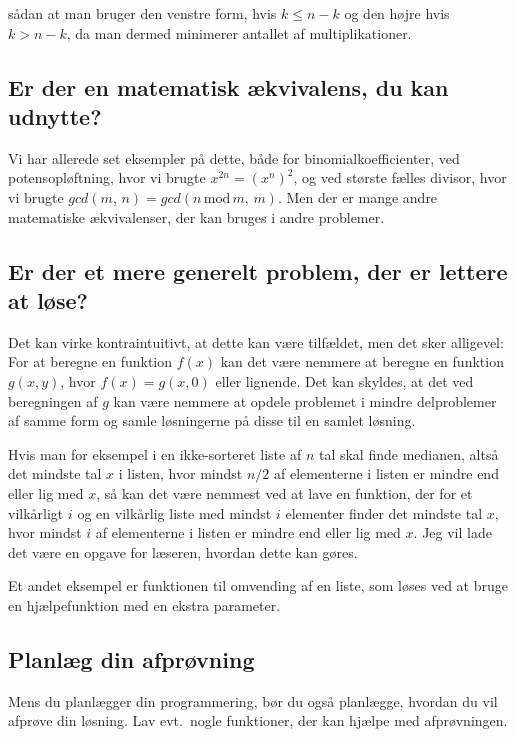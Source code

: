 \documentclass[a4paper,12pt]{article}
\begin{document}
\noindent
sådan at man bruger den venstre form, hvis $k\leq n-k$ og den højre
hvis $k> n-k$, da man dermed minimerer antallet af multiplikationer.

\subsection*{Er der en matematisk ækvivalens, du kan udnytte?}

Vi har allerede set eksempler på dette, både for
binomialkoefficienter, ved potensopløftning, hvor vi brugte $x^{2n} =
(x^n)^2$, og ved største fælles divisor, hvor vi brugte $gcd(m,\,n) =
gcd(n\,\textrm{mod}\,m,\, m)$.  Men der er mange andre matematiske
ækvivalenser, der kan bruges i andre problemer.

\subsection*{Er der et mere generelt problem, der er lettere at løse?}

Det kan virke kontraintuitivt, at dette kan være tilfældet, men det sker
alligevel: For at beregne en funktion $f(x)$ kan det være nemmere at
beregne en funktion $g(x,y)$, hvor $f(x) = g(x,0)$ eller lignende.
Det kan skyldes, at det ved beregningen af $g$ kan være nemmere at
opdele problemet i mindre delproblemer af samme form og samle
løsningerne på disse til en samlet løsning.

Hvis man for eksempel i en ikke-sorteret liste af $n$ tal skal finde
medianen, altså det mindste tal $x$ i listen, hvor mindst $n/2$ af
elementerne i listen er mindre end eller lig med $x$, så kan det være
nemmest ved at lave en funktion, der for et vilkårligt $i$ og en
vilkårlig liste med mindst $i$ elementer finder det mindste tal $x$,
hvor mindst $i$ af elementerne i listen er mindre end eller lig med
$x$.  Jeg vil lade det være en opgave for læseren, hvordan dette kan
gøres.

Et andet eksempel er funktionen til omvending af en liste, som løses
ved at bruge en hjælpefunktion med en ekstra parameter.

\subsection*{Planlæg din afprøvning}

Mens du planlægger din programmering, bør du også planlægge, hvordan
du vil afprøve din løsning.  Lav evt.\ nogle funktioner, der kan
hjælpe med afprøvningen.
\end{document}

